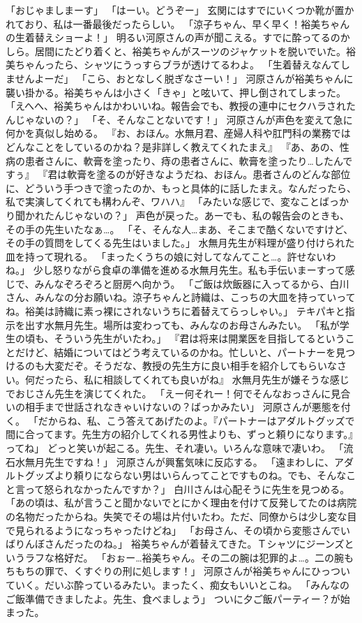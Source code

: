 「おじゃましまーす」
「はーい。どうぞー」
玄関にはすでにいくつか靴が置かれており、私は一番最後だったらしい。
「涼子ちゃん、早く早く！裕美ちゃんの生着替えショーよ！」
明るい河原さんの声が聞こえる。すでに酔ってるのかしら。居間にたどり着くと、裕美ちゃんがスーツのジャケットを脱いでいた。裕美ちゃんったら、シャツにうっすらブラが透けてるわよ。
「生着替えなんてしませんよーだ」
「こら、おとなしく脱ぎなさーい！」
河原さんが裕美ちゃんに襲い掛かる。裕美ちゃんは小さく「きゃ」と呟いて、押し倒されてしまった。
「えへへ、裕美ちゃんはかわいいね。報告会でも、教授の連中にセクハラされたんじゃないの？」
「そ、そんなことないです！」
河原さんが声色を変えて急に何かを真似し始める。
『お、おほん。水無月君、産婦人科や肛門科の業務ではどんなことをしているのかね？是非詳しく教えてくれたまえ』
『あ、あの、性病の患者さんに、軟膏を塗ったり、痔の患者さんに、軟膏を塗ったり…したんですぅ』
『君は軟膏を塗るのが好きなようだね、おほん。患者さんのどんな部位に、どういう手つきで塗ったのか、もっと具体的に話したまえ。なんだったら、私で実演してくれても構わんぞ、ワハハ』
「みたいな感じで、変なことばっかり聞かれたんじゃないの？」
声色が戻った。あーでも、私の報告会のときも、その手の先生いたなぁ…。
「そ、そんな人…まあ、そこまで酷くないですけど、その手の質問をしてくる先生はいました。」
水無月先生が料理が盛り付けられた皿を持って現れる。
「まったくうちの娘に対してなんてこと…。許せないわね。」
少し怒りながら食卓の準備を進める水無月先生。私も手伝いまーすって感じで、みんなぞろぞろと厨房へ向かう。
「ご飯は炊飯器に入ってるから、白川さん、みんなの分お願いね。涼子ちゃんと詩織は、こっちの大皿を持っていってね。裕美は詩織に素っ裸にされないうちに着替えてらっしゃい。」
テキパキと指示を出す水無月先生。場所は変わっても、みんなのお母さんみたい。
「私が学生の頃も、そういう先生がいたわ。」
『君は将来は開業医を目指してるということだけど、結婚についてはどう考えているのかね。忙しいと、パートナーを見つけるのも大変だぞ。そうだな、教授の先生方に良い相手を紹介してもらいなさい。何だったら、私に相談してくれても良いがね』
水無月先生が嫌そうな感じでおじさん先生を演じてくれた。
「えー何それー！何でそんなおっさんに見合いの相手まで世話されなきゃいけないの？ばっかみたい」
河原さんが悪態を付く。
「だからね、私、こう答えてあげたのよ。『パートナーはアダルトグッズで間に合ってます。先生方の紹介してくれる男性よりも、ずっと頼りになります。』ってね」
どっと笑いが起こる。先生、それ凄い。いろんな意味で凄いわ。
「流石水無月先生ですね！」
河原さんが興奮気味に反応する。
「遠まわしに、アダルトグッズより頼りにならない男はいらんってことですものね。でも、そんなこと言って怒られなかったんですか？」
白川さんは心配そうに先生を見つめる。
「あの頃は、私が言うこと聞かないでとにかく理由を付けて反発してたのは病院の名物だったからね。失笑でその場は片付いたわ。ただ、同僚からは少し変な目で見られるようになっちゃったけどね」
「お母さん、その頃から変態さんでいばりんぼさんだったのね。」
裕美ちゃんが着替えてきた。Ｔシャツにジーンズというラフな格好だ。
「おぉー…裕美ちゃん。その二の腕は犯罪的よ…。二の腕もちもちの罪で、くすぐりの刑に処します！」
河原さんが裕美ちゃんにひっついていく。だいぶ酔っているみたい。まったく、痴女もいいとこね。
「みんなのご飯準備できましたよ。先生、食べましょう」
ついに夕ご飯パーティー？が始まった。

